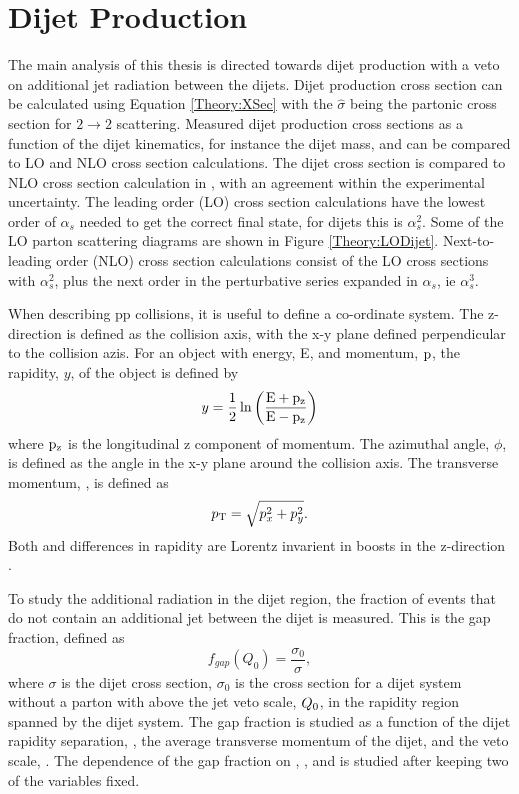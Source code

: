 \section{Dijet Production}
\label{sec:Theory:Dijet}

The main analysis of this thesis is directed towards dijet production with a veto on additional jet radiation between the dijets.
Dijet production cross section can be calculated using Equation \ref{Theory:XSec} with the $\hat{\sigma}$ being the partonic cross section for $2\rightarrow 2$ scattering.
Measured dijet production cross sections as a function of the dijet kinematics, for instance the dijet mass, and can be compared to LO and NLO cross section calculations.
The dijet cross section is compared to NLO cross section calculation in \cite{ref:Dijet}, with an agreement within the experimental uncertainty.
The leading order (LO) cross section calculations have the lowest order of $\alpha_{s}$ needed to get the correct final state, for dijets this is $\alpha_{s}^{2}$.
Some of the LO parton scattering diagrams are shown in Figure \ref{Theory:LODijet}.
Next-to-leading order (NLO) cross section calculations consist of the LO cross sections with $\alpha_{s}^{2}$, plus the next order in the perturbative series expanded in $\alpha_{s}$, ie $\alpha_{s}^{3}$.


When describing pp collisions, it is useful to define a co-ordinate system.
The z-direction is defined as the collision axis, with the x-y plane defined perpendicular to the collision azis.
For an object with energy, E, and momentum, $\bold{\rm p}$, the rapidity, $y$, of the object is defined by
\begin{equation}
y=\frac{1}{2}\ln\left(\rm \frac{E+p_z}{E-p_z}\right)
\label{Theory:Rapidity}
\end{equation}
where $\rm p_{z}$ is the longitudinal z component of momentum. 
The azimuthal angle, $\phi$, is defined as the angle in the x-y plane around the collision axis.
The transverse momentum, \pt{}, is defined as
\begin{equation}
\mbox{$p_{\rm T}$}{}=\sqrt{ p_{x}^{2} +  p_{y}^{2}}.
\label{Theory:pt}
\end{equation}
Both \pt{} and differences in rapidity are Lorentz invarient in boosts in the z-direction \cite{ref:Rapidity}.  
 

To study the additional radiation in the dijet region, the fraction of events that do not contain an additional jet between the dijet is measured.
This is the gap fraction, defined as
\begin{equation}
f_{gap}(Q_{0}) = \frac{\sigma_{0}}{\sigma},
\label{Theory:GapFraction}
\end{equation}
where $\sigma$ is the dijet cross section,  $\sigma_{0}$ is the cross section for a dijet system without a parton with \pt{} above the jet veto scale, $\mbox{$Q_0$}{}$, in the rapidity region spanned by the dijet system.
The gap fraction is studied as a function of the dijet rapidity separation, \dy{}, the average transverse momentum of the dijet, \ptb{} and the veto scale, \qz{}.
The dependence of the gap fraction on \dy{}, \ptb{}, and \qz{} is studied after keeping two of the variables fixed.

